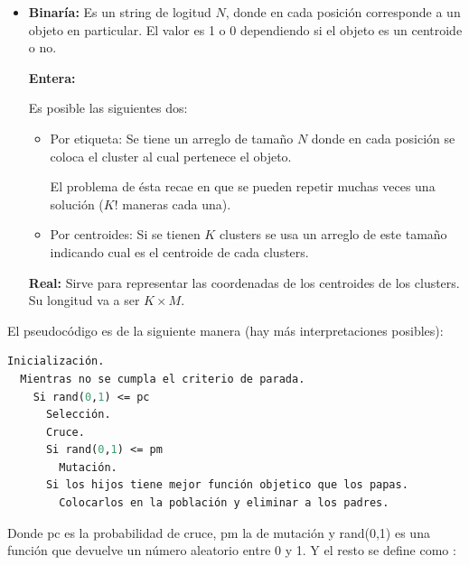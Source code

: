 \begin{itemize}

\item {\bf Binar\'ia:} Es un string de logitud $N$, donde en cada posici\'on
corresponde a un objeto en particular. El valor es 1 o 0 dependiendo si 
el objeto es un centroide o no.

{\bf Entera:}

Es posible las siguientes dos:

\begin{itemize}

\item Por etiqueta: Se tiene un arreglo de tama\~no $N$ donde en cada posici\'on
se coloca el cluster al cual pertenece el objeto.

El problema de \'esta recae en que se pueden repetir muchas veces una soluci\'on ($K!$ maneras cada una).

\item Por centroides: Si se tienen $K$ clusters se usa un arreglo de este tama\~no
indicando cual es el centroide de cada clusters.

\end{itemize}

{\bf Real:} Sirve para representar las coordenadas de los centroides de los clusters.
Su longitud va a ser $K \times M$.

\end{itemize}

El pseudoc\'odigo es de la siguiente manera (hay m\'as interpretaciones posibles):

\begin{lstlisting}[mathescape, language=Pascal]
  Inicialización.
  Mientras no se cumpla el criterio de parada.
    Si rand(0,1) <= pc
      Selección.
      Cruce.
      Si rand(0,1) <= pm
        Mutación.
      Si los hijos tiene mejor función objetico que los papas.
        Colocarlos en la población y eliminar a los padres.
\end{lstlisting}

Donde pc es la probabilidad de cruce, pm la de mutaci\'on y rand(0,1)
es una funci\'on que devuelve un n\'umero aleatorio entre 0 y 1. Y el resto
se define como :

